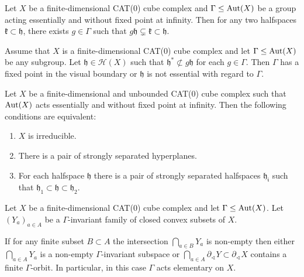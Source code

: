 \begin{lemma}
  \label{lem:cs-dsl}
  Let \(X\) be a finite-dimensional CAT(0) cube complex and \(\Gamma \leq \operatorname{Aut}(X)\) be a group acting essentially and without fixed point at infinity. Then for any two halfspaces \(\mathfrak{k} \subset \mathfrak{h}\), there exists \(g \in \Gamma\) such that \(g \mathfrak{h} \subsetneq \mathfrak{k} \subset \mathfrak{h}\).
\end{lemma}

\begin{thm}
  \label{thm:cs-flipping}
  Assume that \(X\) is a finite-dimensional CAT(0) cube complex and let \(\Gamma \leq \operatorname{Aut}(X)\) be any subgroup. Let \(\mathfrak{h} \in \mathcal{H}(X)\) such that \(\mathfrak{h}^\ast \not\subset g\mathfrak{h}\) for each \(g \in \Gamma\). Then \(\Gamma\) has a fixed point in the visual boundary or \(\mathfrak{h}\) is not essential with regard to \(\Gamma\).
\end{thm}

\begin{prop}
  \label{prop:cs-5.1}
  Let \(X\) be a finite-dimensional and unbounded CAT(0) cube complex such that \(\operatorname{Aut}(X)\) acts essentially and without fixed point at infinity. Then the following conditions are equivalent:
  \begin{enumerate}
  \item \(X\) is irreducible.
  \item There is a pair of strongly separated hyperplanes.
  \item For each halfspace \(\mathfrak{h}\) there is a pair of strongly separated halfspaces \(\mathfrak{h_i}\) such that \(\mathfrak{h}_1 \subset \mathfrak{h} \subset \mathfrak{h}_2\).
  \end{enumerate}
\end{prop}

\begin{prop}
  \label{prop:cs-3.6}
  Let \(X\) be a finite-dimensional CAT(0) cube complex and let \(\Gamma \leq \operatorname{Aut}(X)\). Let \((Y_a)_{a \in A}\) be a \(\Gamma\)-invariant family of closed convex subsets of \(X\).

  If for any finite subset \(B \subset A\) the intersection \(\bigcap_{a \in B}Y_a\)  is non-empty then either \(\bigcap_{a \in A} Y_a\) is a non-empty \(\Gamma\)-invariant subspace or \(\bigcap_{a \in A} \partial_{\sphericalangle} Y \subset \partial_{\sphericalangle}X\) contains a finite \(\Gamma\)-orbit. In particular, in this case \(\Gamma\) acts elementary on \(X\).
\end{prop}

